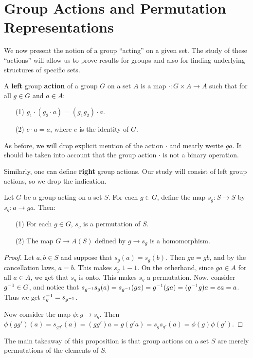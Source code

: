\section{Group Actions and Permutation Representations}
\label{section_4.1}

We now present the notion of a group ``acting'' on a given set. The study of
these ``actions'' will allow us to prove results for groups and also for finding
underlying structures of specific sets.

\begin{definition}
  A \textbf{left} group \textbf{action} of a group $G$ on a set  $A$ is a map
  $\cdot: G \times A
  \rightarrow A$ such that for all $g \in G$ and  $a \in A$:
  \begin{enumerate}
    \item[(1)] $g_1 \cdot (g_2 \cdot a)=(g_1g_2) \cdot a$.

    \item[(2)] $e \cdot a=a$, where  $e$ is the identity of  $G$.
  \end{enumerate}
\end{definition}
\begin{remark}
  As before, we will drop explicit mention of the action $\cdot$ and mearly
  werite $ga$. It should be taken into account that the group action $\cdot$
  is not a binary operation.
\end{remark}
\begin{remark}
  Similarly, one can define \textbf{right} group actions. Our study will
  consist of left group actions, so we drop the indication.
\end{remark}

\begin{proposition}\label{proposition_4.1.1}
  Let $G$ be a group acting on a set $S$. For each $g \in G$, define the map
  $s_g:S \rightarrow S$ by $s_g:a \rightarrow ga$. Then:
  \begin{enumerate}
    \item[(1)] For each $g \in G$,  $s_g$ is a permutation of  $S$.

    \item [(2)] The map $G \rightarrow A(S)$ defined by $g \rightarrow
      s_g$ is a homomorphism.
  \end{enumerate}
\end{proposition}
\begin{proof}
  Let $a,b \in S$ and suppose that $s_g(a)=s_g(b)$. Then $ga=gb$,
  and by the cancellation laws,  $a=b$. This makes $s_g$  $1-1$. On the
  otherhand, since $ga \in A$ for all $a \in A$, we get that $s_g$ is
  onto. This makes  $s_g$ a permutation. Now, consider  $g^{-1} \in G$,
  and notice that
  $s_{g^{-1}}s_g(a)=s_{g^{-1}}(ga)=g^{-1}(ga)=(g^{-1}g)a=ea=a$.
  Thus we get $s_g^{-1}=s_{g^{-1}}$.

  Now consider the map $\phi:g \rightarrow s_g$. Then
  $\phi(gg')(a)=s_{gg'}(a)=(gg')a=g(g'a)=s_gs_{g'}(a)= \phi(g)\phi(g')$.
\end{proof}
\begin{remark}
  The main takeaway of this proposition is that group actions on a set $S$ are
  merely permutations of the elements of  $S$.
\end{remark}

